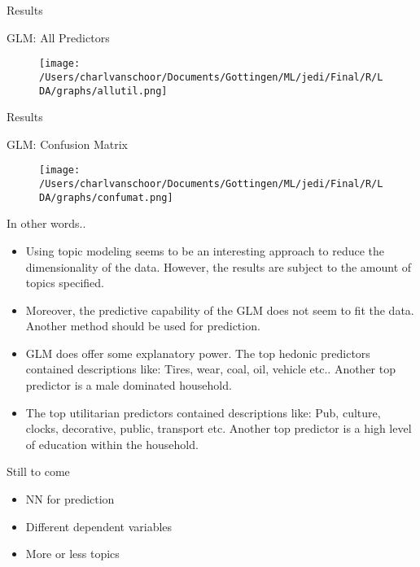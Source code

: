 \documentclass{beamer}
\begin{document}
\begin{frame}{Results}

\begin{block}{GLM: All Predictors}
\begin{figure}
\texttt{[image: /Users/charlvanschoor/Documents/Gottingen/ML/jedi/Final/R/LDA/graphs/allutil.png]}
\end{figure}
\end{block}

\end{frame}

\begin{frame}{Results}

\begin{block}{GLM: Confusion Matrix}
\begin{figure}
\texttt{[image: /Users/charlvanschoor/Documents/Gottingen/ML/jedi/Final/R/LDA/graphs/confumat.png]}
\end{figure}
\end{block}

\end{frame}


\begin{frame}{In other words..}
\begin{itemize}
  \item Using topic modeling seems to be an interesting approach to reduce the dimensionality of the data. However, the results are subject to the amount of topics specified. 
  \pause{} 
  \item Moreover, the predictive capability of the GLM does not seem to fit the data. Another method should be used for prediction. 
  \pause{} 
  \item GLM does offer some explanatory power. The top hedonic predictors contained descriptions like: Tires, wear, coal, oil, vehicle etc.. Another top predictor is a male dominated household.
  \pause{} 
  \item The top utilitarian predictors contained descriptions like: Pub, culture, clocks, decorative, public, transport etc. Another top predictor is a high level of education within the household. 
\end{itemize}

\end{frame}

\begin{frame}{Still to come}
\begin{itemize}
  \item NN for prediction
  \item Different dependent variables
  \item More or less topics
\end{itemize}

\end{frame}
\end{document}

